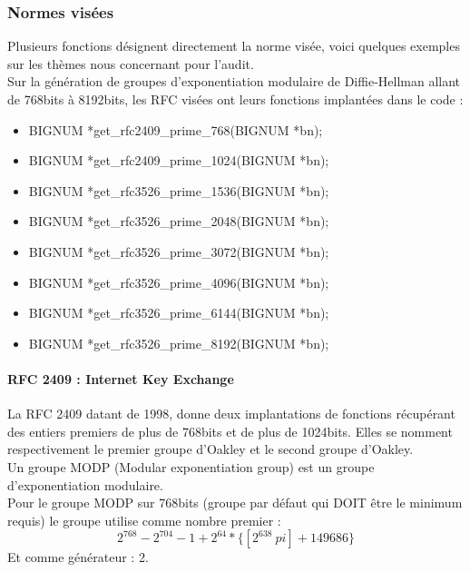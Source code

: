 		\subsubsection{Normes visées}

			Plusieurs fonctions désignent directement la norme visée, voici quelques exemples sur les thèmes nous concernant pour l'audit.\\
			Sur la génération de groupes d'exponentiation modulaire de Diffie-Hellman allant de 768bits à 8192bits, les RFC visées  \cite{rfc2409} \cite{rfc3526} ont leurs fonctions implantées dans le code :
			\begin{itemize}
			\item BIGNUM *get\_rfc2409\_prime\_768(BIGNUM *bn);
			\item BIGNUM *get\_rfc2409\_prime\_1024(BIGNUM *bn);
			\item BIGNUM *get\_rfc3526\_prime\_1536(BIGNUM *bn);
			\item BIGNUM *get\_rfc3526\_prime\_2048(BIGNUM *bn);
			\item BIGNUM *get\_rfc3526\_prime\_3072(BIGNUM *bn);
			\item BIGNUM *get\_rfc3526\_prime\_4096(BIGNUM *bn);
			\item BIGNUM *get\_rfc3526\_prime\_6144(BIGNUM *bn);
			\item BIGNUM *get\_rfc3526\_prime\_8192(BIGNUM *bn);
			\end{itemize}

			\paragraph{RFC 2409 : Internet Key Exchange\\}

			La RFC 2409 \cite{rfc2409} datant de 1998, donne deux implantations de fonctions récupérant des entiers premiers de plus de 768bits et de plus de 1024bits. Elles se nomment respectivement le premier groupe d'Oakley et le second groupe d'Oakley.\\

			Un groupe MODP (Modular exponentiation group) est un groupe d'exponentiation modulaire. \\
			
			Pour le groupe MODP sur 768bits (groupe par défaut qui DOIT être le minimum requis) le groupe utilise comme nombre premier : 
			$$ 2^{768} - 2^{704} - 1 + 2^{64} * \{[2^{638}\ pi] + 149686\}$$
			Et comme générateur : 2.\\

